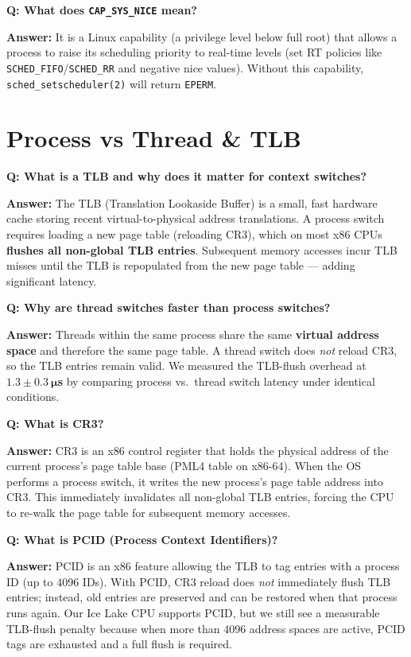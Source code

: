 \documentclass[12pt,a4paper]{article}
\newcommand{\Q}[1]{\begin{mdframed}[style=qbox]
\textbf{\textcolor{qcol}{Q: #1}}\end{mdframed}\vspace{2pt}}
\newcommand{\A}[1]{\begin{mdframed}[style=abox]
\textbf{\textcolor{acol}{Answer:}} #1\end{mdframed}\vspace{10pt}}
\begin{document}
\Q{What does \texttt{CAP\_SYS\_NICE} mean?}
\A{It is a Linux capability (a privilege level below full root) that allows a process to raise its scheduling priority to real-time levels (set RT policies like \texttt{SCHED\_FIFO}/\texttt{SCHED\_RR} and negative nice values). Without this capability, \texttt{sched\_setscheduler(2)} will return \texttt{EPERM}.}

\section{Process vs Thread \& TLB}

\Q{What is a TLB and why does it matter for context switches?}
\A{The TLB (Translation Lookaside Buffer) is a small, fast hardware cache storing recent virtual-to-physical address translations. A process switch requires loading a new page table (reloading CR3), which on most x86 CPUs \textbf{flushes all non-global TLB entries}. Subsequent memory accesses incur TLB misses until the TLB is repopulated from the new page table --- adding significant latency.}

\Q{Why are thread switches faster than process switches?}
\A{Threads within the same process share the same \textbf{virtual address space} and therefore the same page table. A thread switch does \textit{not} reload CR3, so the TLB entries remain valid. We measured the TLB-flush overhead at $\mathbf{1.3 \pm 0.3~\mu}$\textbf{s} by comparing process vs.\ thread switch latency under identical conditions.}

\Q{What is CR3?}
\A{CR3 is an x86 control register that holds the physical address of the current process's page table base (PML4 table on x86-64). When the OS performs a process switch, it writes the new process's page table address into CR3. This immediately invalidates all non-global TLB entries, forcing the CPU to re-walk the page table for subsequent memory accesses.}

\Q{What is PCID (Process Context Identifiers)?}
\A{PCID is an x86 feature allowing the TLB to tag entries with a process ID (up to 4096 IDs). With PCID, CR3 reload does \textit{not} immediately flush TLB entries; instead, old entries are preserved and can be restored when that process runs again. Our Ice Lake CPU supports PCID, but we still see a measurable TLB-flush penalty because when more than 4096 address spaces are active, PCID tags are exhausted and a full flush is required.}
\end{document}
